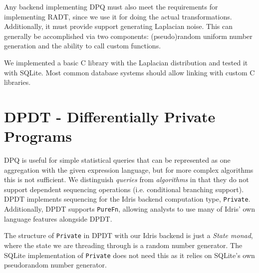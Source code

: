 \documentclass[12pt]{report}
\begin{document}
Any backend implementing DPQ must also meet the requirements for implementing RADT, since we use it for doing the actual transformations.
Additionally, it must provide support generating Laplacian noise.
This can generally be accomplished via two components: (pseudo)random uniform number generation and the ability to call custom functions.

We implemented a basic C library with the Laplacian distribution and tested it with SQLite.
Most common database systems should allow linking with custom C libraries.

\chapter{DPDT - Differentially Private Programs}\label{sec:DPDT}

DPQ is useful for simple statistical queries that can be represented as one aggregation with the given expression language, but for more complex algorithms this is not sufficient.
We distinguish \textit{queries} from \textit{algorithms} in that they do not support dependent sequencing operations (i.e. conditional branching support).
DPDT implements sequencing for the Idris backend computation type, \texttt{Private}.
Additionally, DPDT supports \texttt{PureFn}, allowing analysts to use many of Idris' own language features alongside DPDT.

The structure of \texttt{Private} in DPDT with our Idris backend is just a \textit{State monad}, where the state we are threading through is a random number generator.
The SQLite implementation of \texttt{Private} does not need this as it relies on SQLite's own pseudorandom number generator.
\end{document}

